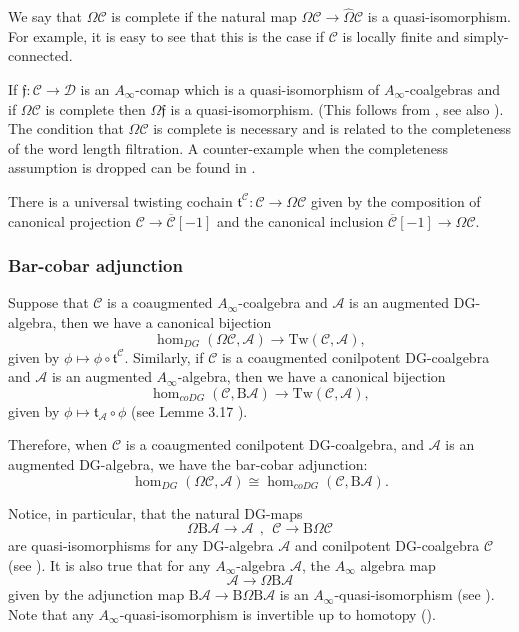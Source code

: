 \documentclass{gtpart}
\renewcommand{\t}{\mathfrak{t}}
\newcommand{\A}{\mathscr{A}}
\newcommand{\Cbar}{\overline{\mathscr{C}}}
\renewcommand{\Bar}{\mathrm{B}}
\renewcommand{\C}{\mathscr{C}}
\renewcommand{\D}{\mathscr{D}}
\begin{document}
We say that $\Omega\C$ is complete if the natural map $\Omega \C \to \widehat{\Omega}
\C$ is a quasi-isomorphism. For example, it is easy to see that this is the case if $\C$ is locally
finite and simply-connected. 

If $\mathfrak{f}\colon \C \to \D$ is an $A_\infty$-comap which is a quasi-isomorphism of $A_\infty$-coalgebras and if $\Omega\C$ is complete then $\Omega \mathfrak{f}$ is a quasi-isomorphism. (This follows from \cite[Theorem 7.4]{EM}, see also \cite[Theorem 5.5.11]{weibel}).
The condition that $\Omega \C$ is complete is necessary and is related to the completeness of the
word length filtration. A counter-example when the completeness assumption is dropped can be found in \cite[Section 2.4.1]{LV}. 

There is a universal twisting cochain $\t^\C\colon \C \to \Omega \C$ given by the composition of
canonical projection $\C \to \Cbar[-1]$ and the canonical inclusion $\Cbar[-1] \to \Omega \C$.


\subsubsection{Bar-cobar adjunction}\label{ssec:barcobaradj}
Suppose that $\C$ is a coaugmented $A_\infty$-coalgebra and $\A$ is an augmented DG-algebra, then we have a canonical
bijection 
\begin{equation}\label{bij1}  
\hom_{DG} (\Omega \C, \A) \to \mathrm{Tw}(\C,\A),
\end{equation} 
given by $\phi \mapsto \phi \circ \t^\C$.
Similarly, if $\C$ is a coaugmented conilpotent DG-coalgebra and $\A$ is an augmented $A_\infty$-algebra, then we have a canonical
bijection 
\begin{equation}\label{bij2} 
\hom_{coDG} (\C, \Bar \A) \to \mathrm{Tw}(\C,\A), 
\end{equation}
given by $\phi \mapsto \t_\A \circ \phi$ (see Lemme 3.17 \cite{proute}).

Therefore, when $\C$ is a coaugmented conilpotent DG-coalgebra, and $\A$ is an augmented DG-algebra, we have the bar-cobar adjunction: 
\[ \hom_{DG}( \Omega \C, \A) \cong \hom_{coDG}(\C, \Bar \A). \]

Notice, in particular, that the natural DG-maps
 \begin{equation} \label{barcobar} \Omega \Bar \A \to \A \ \ , \ \ \C \to \Bar \Omega \C \end{equation}
     are quasi-isomorphisms for any DG-algebra $\A$ and conilpotent DG-coalgebra $\C$
     (see \cite[Section 6.10]{Posit}). It is also
 true that for any $A_\infty$-algebra $\A$, the $A_\infty$ algebra map \[ \A \to \Omega \Bar \A\] given
 by the adjunction map $\Bar \A \to \Bar \Omega \Bar \A$ is an
 $A_\infty$-quasi-isomorphism (see
 \cite[Lemme 2.3.4.3]{L-H}). Note that any $A_\infty$-quasi-isomorphism is invertible up to
 homotopy (\cite[Corollary 1.4]{seidelbook}).
\end{document}
